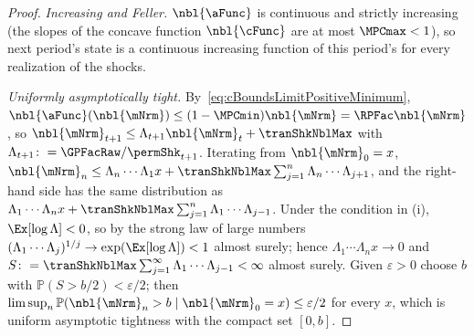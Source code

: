 \documentclass[\econtexRoot/BufferStockTheory]{subfiles}
\begin{document}
\begin{proof}
\emph{Increasing and Feller.}
$\nbl{\aFunc}$ is continuous and strictly increasing (the slopes of the concave function $\nbl{\cFunc}$ are at most $\MPCmax<1$), so next period's state is a continuous increasing function of this period's for every realization of the shocks.

\emph{Uniformly asymptotically tight.}
By~\eqref{eq:cBoundsLimitPositiveMinimum}, $\nbl{\aFunc}(\nbl{\mNrm})\leq(1-\MPCmin)\nbl{\mNrm}=\RPFac\nbl{\mNrm}$, so $\nbl{\mNrm}_{t+1}\leq \Lambda_{t+1}\nbl{\mNrm}_{t}+\tranShkNblMax$ with $\Lambda_{t+1}\colon=\GPFacRaw/\permShk_{t+1}$.
Iterating from $\nbl{\mNrm}_{0}=x$, $\nbl{\mNrm}_{n}\leq \Lambda_{n}\cdots \Lambda_{1}x+\tranShkNblMax\sum_{j=1}^{n}\Lambda_{n}\cdots \Lambda_{j+1}$, and the right-hand side has the same distribution as $\Lambda_{1}\cdots \Lambda_{n}x+\tranShkNblMax\sum_{j=1}^{n}\Lambda_{1}\cdots \Lambda_{j-1}$.
Under the condition in (i), $\Ex[\log\Lambda]<0$, so by the strong law of large numbers $(\Lambda_{1}\cdots \Lambda_{j})^{1/j}\rightarrow\exp(\Ex[\log\Lambda])<1$ almost surely; hence $\Lambda_{1}\cdots \Lambda_{n}x\rightarrow 0$ and $S\colon=\tranShkNblMax\sum_{j=1}^{\infty}\Lambda_{1}\cdots \Lambda_{j-1}<\infty$ almost surely.
Given $\varepsilon>0$ choose $b$ with $\mathbb{P}(S>b/2)<\varepsilon/2$; then $\limsup_{n}\mathbb{P}(\nbl{\mNrm}_{n}>b\mid\nbl{\mNrm}_{0}=x)\leq\varepsilon/2$ for every $x$, which is uniform asymptotic tightness with the compact set $[0,b]$.


\end{proof}
\end{document}

